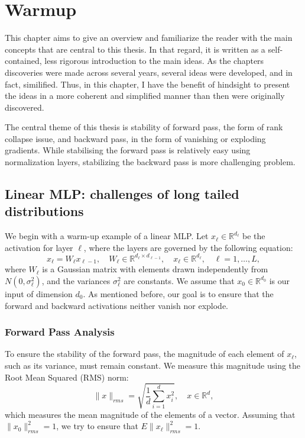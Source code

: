 

\chapter{Warmup}\label{ch:warmup}

This chapter aims to give an overview and familiarize the reader with the main concepts that are central to this thesis. In that regard, it is written as a self-contained, less rigorous introduction to the main ideas. As the chapters discoveries were made across several years, several ideas were developed, and in fact, similified. Thus, in this chapter, I have the benefit of hindsight to present the ideas in a more coherent and simplified manner than then were originally discovered. 

The central theme of this thesis is stability of forward pass, the form of rank collapse issue, and backward pass, in the form of vanishing or exploding gradients. While stabilising the forward pass is relatively easy using normalization layers, stabilizing the backward pass is more challenging problem. 

\section{Linear MLP: challenges of long tailed distributions}

We begin with a warm-up example of a linear MLP. Let \( x_\ell \in \mathbb{R}^{d_\ell} \) be the activation for layer \( \ell \), where the layers are governed by the following equation:
\begin{equation}
x_\ell = W_\ell x_{\ell-1}, \quad W_\ell \in \mathbb{R}^{d_\ell \times d_{\ell-1}}, \quad x_\ell \in \mathbb{R}^{d_\ell}, \quad \ell = 1, \dots, L,
\end{equation}
where \( W_{\ell} \) is a Gaussian matrix with elements drawn independently from \( N(0,\sigma_\ell^2) \), and the variances \( \sigma_\ell^2 \) are constants. We assume that \( x_0 \in \mathbb{R}^{d_0} \) is our input of dimension \( d_0 \). As mentioned before, our goal is to ensure that the forward and backward activations neither vanish nor explode.

\subsection{Forward Pass Analysis}

\begin{theorem}
To ensure the stability of the forward pass, the magnitude of each element of \( x_\ell \), such as its variance, must remain constant. We measure this magnitude using the Root Mean Squared (RMS) norm:
\begin{equation}
\|x\|_{rms} = \sqrt{\frac{1}{d} \sum_{i=1}^d x_i^2}, \quad x \in \mathbb{R}^d,
\end{equation}
which measures the mean magnitude of the elements of a vector. Assuming that \( \|x_0\|_{rms}^2 = 1 \), we try to ensure that \( E\|x_\ell\|_{rms}^2 = 1 \).
\end{theorem}

